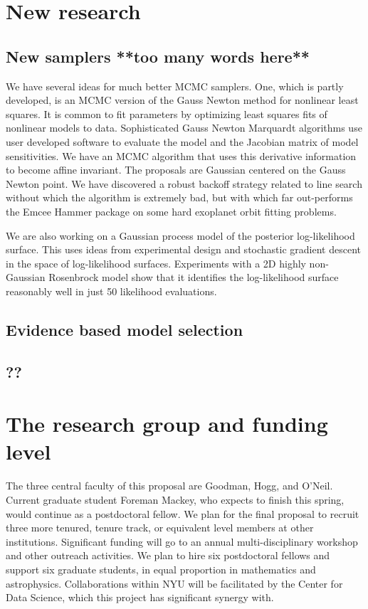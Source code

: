 \documentclass[12pt]{article}
\begin{document}
\section*{New research}
\subsection*{New samplers **too many words here**}
We have several ideas for much better MCMC samplers.
One, which is partly developed, is an MCMC version of the Gauss Newton method for
nonlinear least squares.
It is common to fit parameters by optimizing least squares fits of nonlinear models to data.
Sophisticated Gauss Newton Marquardt algorithms use user developed software to evaluate the 
model and the Jacobian matrix of model sensitivities.
We have an MCMC algorithm that uses this derivative information to become affine invariant.
The proposals are Gaussian centered on the Gauss Newton point.
We have discovered a robust backoff strategy related to line search without which the 
algorithm is extremely bad, but with which far out-performs the Emcee Hammer package on 
some hard exoplanet orbit fitting problems.

We are also working on a Gaussian process model of the posterior log-likelihood surface.
This uses ideas from experimental design and stochastic gradient descent in the space of
log-likelihood surfaces.
Experiments with a 2D highly non-Gaussian Rosenbrock model show that it identifies
the log-likelihood surface reasonably well in just 50 likelihood evaluations.


\subsection*{Evidence based model selection}
\subsection*{??}

\section*{The research group and funding level}
The three central faculty of this proposal are Goodman, Hogg, and O'Neil.
Current graduate student Foreman Mackey, who expects to finish this spring,
would continue as a postdoctoral fellow.
We plan for the final proposal to recruit three more tenured, tenure track, or
equivalent level members at other institutions.
Significant funding will go to an annual multi-disciplinary workshop and other
outreach activities.
We plan to hire six postdoctoral fellows and support six graduate students, in 
equal proportion in mathematics and astrophysics.
Collaborations within NYU will be facilitated by the Center for Data Science, which
this project has significant synergy with.
\end{document}
